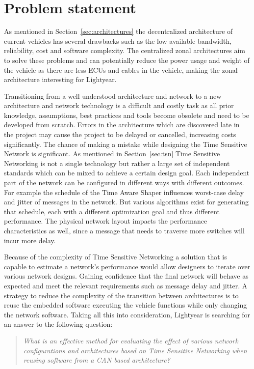 \section{Problem statement}
\label{sec:problem_statement}
As mentioned in Section~\ref{sec:architectures} the decentralized architecture of current vehicles has several drawbacks such as the low available bandwidth, reliability, cost and software complexity. The centralized zonal architectures aim to solve these problems and can potentially reduce the power usage and weight of the vehicle as there are less ECUs and cables in the vehicle, making the zonal architecture interesting for Lightyear.

Transitioning from a well understood architecture and network to a new architecture and network technology is a difficult and costly task as all prior knowledge, assumptions, best practices and tools become obsolete and need to be developed from scratch. Errors in the architecture which are discovered late in the project may cause the project to be delayed or cancelled, increasing costs significantly. The chance of making a mistake while designing the Time Sensitive Network is significant. As mentioned in Section~\ref{sec:tsn} Time Sensitive Networking is not a single technology but rather a large set of independent standards which can be mixed to achieve a certain design goal. Each independent part of the network can be configured in different ways with different outcomes. For example the schedule of the Time Aware Shaper influences worst-case delay and jitter of messages in the network. But various algorithms exist for generating that schedule, each with a different optimization goal and thus different performance. The physical network layout impacts the performance characteristics as well, since a message that needs to traverse more switches will incur more delay.

Because of the complexity of Time Sensitive Networking a solution that is capable to estimate a network's performance would allow designers to iterate over various network designs. Gaining confidence that the final network will behave as expected and meet the relevant requirements such as message delay and jitter. A strategy to reduce the complexity of the transition between architectures is to reuse the embedded software executing the vehicle functions while only changing the network software. Taking all this into consideration, Lightyear is searching for an answer to the following question:

\begin{quote}
    \emph{What is an effective method for evaluating the effect of various network configurations and architectures based on Time Sensitive Networking when reusing software from a CAN based architecture?}
\end{quote}

